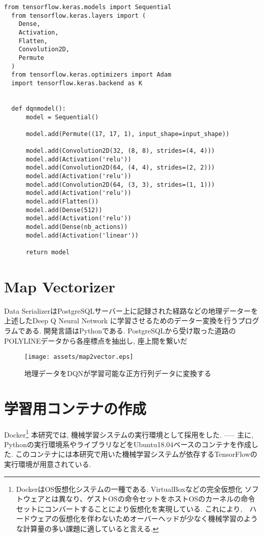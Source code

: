 \begin{lstlisting}[caption = DQNの深層学習部分を形成するモデル, label = program1]
  from tensorflow.keras.models import Sequential
  from tensorflow.keras.layers import (
    Dense,
    Activation,
    Flatten,
    Convolution2D,
    Permute
  )
  from tensorflow.keras.optimizers import Adam
  import tensorflow.keras.backend as K
  
  
  def dqnmodel():
      model = Sequential()
  
      model.add(Permute((17, 17, 1), input_shape=input_shape))
  
      model.add(Convolution2D(32, (8, 8), strides=(4, 4)))
      model.add(Activation('relu'))
      model.add(Convolution2D(64, (4, 4), strides=(2, 2)))
      model.add(Activation('relu'))
      model.add(Convolution2D(64, (3, 3), strides=(1, 1)))
      model.add(Activation('relu'))
      model.add(Flatten())
      model.add(Dense(512))
      model.add(Activation('relu'))
      model.add(Dense(nb_actions))
      model.add(Activation('linear'))
  
      return model  
\end{lstlisting}
  
  

\section{Map Vectorizer}

Data SerializerはPostgreSQLサーバー上に記録された経路などの地理データーを上述したDeep Q Neural Network
に学習させるためのデーター変換を行うプログラムである.
開発言語はPythonである. PostgreSQLから受け取った道路のPOLYLINEデータから各座標点を抽出し, 座上間を繋いだ



\begin{figure}[H]
  \centering  %
  \texttt{[image: assets/map2vector.eps]}
  \caption{地理データをDQNが学習可能な正方行列データに変換する}  \label{map2vector}
\end{figure}



\section{学習用コンテナの作成}

Docker\footnote{DockerはOS仮想化システムの一種である. VirtualBoxなどの完全仮想化
ソフトウェアとは異なり、ゲストOSの命令セットをホストOSのカーネルの命令セットにコンバートすることにより仮想化を実現している.
これにより,　ハードウェアの仮想化を伴わないためオーバーヘッドが少なく機械学習のような計算量の多い課題に適していると言える.}
本研究では, 機械学習システムの実行環境として採用をした.
-----
主に, Pythonの実行環境系やライブラリなどをUbuntu18.04ベースのコンテナを作成した.
このコンテナには本研究で用いた機械学習システムが依存するTensorFlowの実行環境が用意されている.

